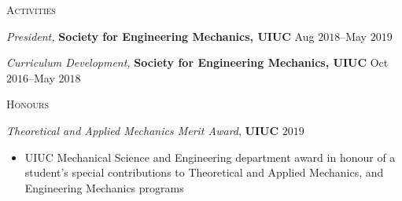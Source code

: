 \documentclass[10pt]{article}
\begin{document}
\begin{multicols}{2}
\textsc{Activities}
\columnbreak

\textit{President,} \textbf{Society for Engineering Mechanics, UIUC} \hfill Aug $2018$--May $2019$

\vspace{-0.75em}

%
\textit{Curriculum Development,} \textbf{Society for Engineering Mechanics, UIUC} \hfill Oct $2016$--May $2018$

%
\end{multicols}
\vspace{-1.5em} 
\begin{multicols}{2}
\textsc{Honours}
\columnbreak

\textit{Theoretical and Applied Mechanics Merit Award}, \textbf{UIUC} \hfill $2019$

\vspace{-1.75em}
\begin{itemize}[label= ]
    \setlength{\itemindent}{-2.50em}
    \item[]  UIUC Mechanical Science and Engineering department award in honour of a student's special contributions to Theoretical and Applied Mechanics, and Engineering Mechanics programs
\end{itemize}
\vspace{-2.0em}

\end{multicols}
\end{document}
